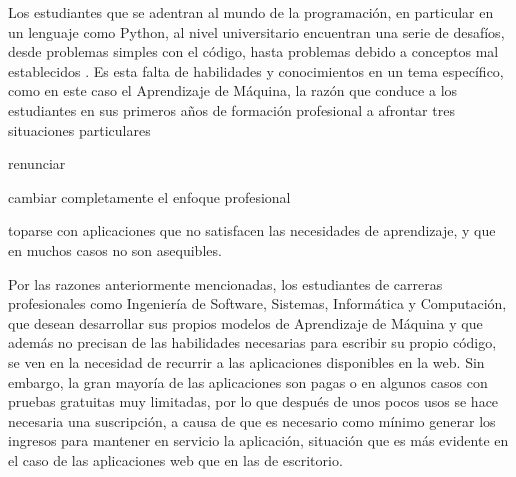 Los estudiantes que se adentran al mundo de la programación, en particular en un lenguaje como Python, al nivel universitario encuentran una serie de desafíos, desde problemas simples con el código, hasta problemas debido a conceptos mal establecidos \parencite{Piwek2020}. Es esta falta de habilidades y conocimientos en un tema específico, como en este caso el Aprendizaje de Máquina, la razón que conduce a los estudiantes en sus primeros años de formación profesional a afrontar tres situaciones particulares
\begin{seriate}
    \item renunciar
    \item cambiar completamente el enfoque profesional
    \item toparse con aplicaciones que no satisfacen las necesidades de aprendizaje, y que en muchos casos no son asequibles.
\end{seriate}
Por las razones anteriormente mencionadas, los estudiantes de carreras profesionales como Ingeniería de Software, Sistemas, Informática y Computación, que desean desarrollar sus propios modelos de Aprendizaje de Máquina y que además no precisan de las habilidades necesarias para escribir su propio código, se ven en la necesidad de recurrir a las aplicaciones disponibles en la web. Sin embargo, la gran mayoría de las aplicaciones son pagas o en algunos casos con pruebas gratuitas muy limitadas, por lo que después de unos pocos usos se hace necesaria una suscripción, a causa de que es necesario como mínimo generar los ingresos para mantener en servicio la aplicación, situación que es más evidente en el caso de las aplicaciones web que en las de escritorio.


